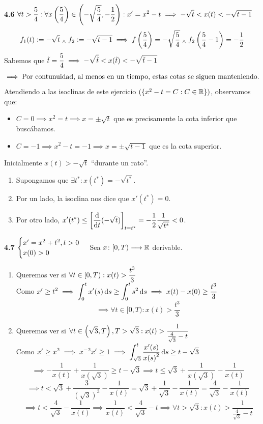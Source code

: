 \textbf{4.6} $\displaystyle \forall t > \frac{5}{4} : \forall x\left(\frac{5}{4}\right) \in \left(-\sqrt{\frac{5}{4}}, -\frac{1}{2}\right) : x'=x^2-t \implies -\sqrt{t} < x(t) < -\sqrt{t-1}$
\[f_1(t)\vcentcolon=-\sqrt{t} \; _{\wedge} \; f_2 \vcentcolon= -\sqrt{t-1} \implies f\left(\frac{5}{4}\right)=-\sqrt{\frac{5}{4}} \; _{\wedge} \; f_2\left(\frac{5}{4} - 1\right)=-\frac{1}{2}\]
Sabemos que $\displaystyle \tilde{t} = \frac{5}{4} \implies -\sqrt{\tilde{t}} < x(\tilde{t}) < -\sqrt{\tilde{t}-1}$
\[\implies \text{Por contunuidad, al menos en un tiempo, estas cotas se siguen manteniendo.}\]
Atendiendo a las isoclinas de este ejercicio $(\{x^2-t=C : C\in \mathbb{R}\})$, observamos que:
\begin{itemize}
	\item $C=0 \implies x^2=t \implies x=\pm\sqrt{t}$ que es precisamente la cota inferior que buscábamos.
	\item $C=-1 \implies x^2-t=-1 \implies x=\pm\sqrt{t-1}$ que es la cota superior.
\end{itemize}
Inicialmente $x(t)>-\sqrt{t}$ ``durante un rato''.
\begin{enumerate}
	\item Supongamos que $\exists t^* : x(t^*)=-\sqrt{t^*}$.
	\item Por un lado, la isoclina nos dice que $x'(t^*)=0$.
	\item Por otro lado, $\ds x'(t^*)\leq {\left[\odv{}{t} (-\sqrt{t})\right]}_{t=t^*} = -\frac{1}{2}\frac{1}{\sqrt{t^*}}<0$.
\end{enumerate}

\textbf{4.7} $\displaystyle \begin{cases}
		x' = x^2 + t^2, t >0 \\
		x(0)>0
	\end{cases}$ Sea $x \colon [0, T) \longrightarrow \mathbb{R}$ derivable.
\begin{enumerate}
	\item Queremos ver si $\displaystyle \forall t \in [0, T) : x(t)> \frac{t^3}{3}$ \\
	      Como $\ds x'\geq t^2 \implies \int_{0}^{t} x'(s) \odif{s} \geq \int_{0}^{t} s^2 \odif{s} \implies x(t)-x(0)\geq \frac{t^3}{3}$
	      \[\implies \boxed{\forall t \in [0, T) : x(t)>\frac{t^3}{3}}\]
	\item Queremos ver si $\displaystyle \forall t \in \left(\sqrt{3}, T\right), T>\sqrt{3} : x(t)> \frac{1}{\frac{4}{\sqrt{3}}-t}$ \\
	      Como $\ds x'\geq x^2 \implies x^{-2}x'\geq 1 \implies \int_{\sqrt{3}}^{t} \frac{x'(s)}{{x(s)}^2} \odif{s} \geq t-\sqrt{3}$
	      \[\implies -\frac{1}{x(t)}+ \frac{1}{x(\sqrt{3})} \geq t-\sqrt{3} \implies t \leq \sqrt{3} +\frac{1}{x(\sqrt{3})}- \frac{1}{x(t)}\]
	      \[\implies t< \sqrt{3} + \frac{3}{{\left(\sqrt{3}\right)}^3} - \frac{1}{x(t)}= \sqrt{3} + \frac{1}{\sqrt{3}}- \frac{1}{x(t)}=\frac{4}{\sqrt{3}}- \frac{1}{x(t)}\]
	      \[\implies t < \frac{4}{\sqrt{3}}-\frac{1}{x(t)} \implies \frac{1}{x(t)} < \frac{4}{\sqrt{3}}-t \implies \boxed{\forall t > \sqrt{3} : x(t) > \frac{1}{\frac{4}{\sqrt{3}}-t}}\]
\end{enumerate}

